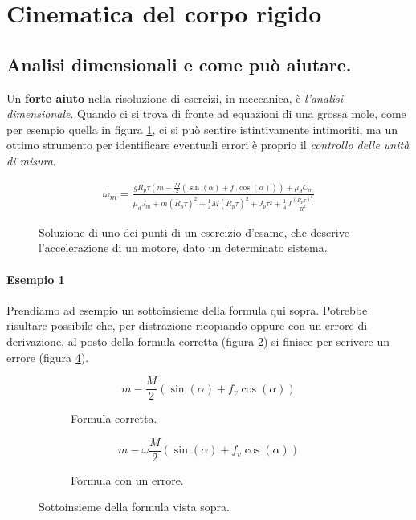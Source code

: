 \documentclass[main.tex]{subfiles}
\begin{document}
\section{Cinematica del corpo rigido}

\subsection{Analisi dimensionali e come può aiutare.}
Un \textbf{forte aiuto} nella risoluzione di esercizi, in meccanica, è \textit{l'analisi dimensionale}. Quando ci si trova di fronte ad equazioni di una grossa mole, come per esempio quella in figura \ref{big_equation}, ci si può sentire istintivamente intimoriti, ma un ottimo strumento per identificare eventuali errori è proprio il \textit{controllo delle unità di misura}.


\begin{figure}[H]
  \begin{equation}
\begin{split}
\dot{\omega_m} = \frac{gR_p\tau(m -\frac{M}{2}(\sin(\alpha) + f_v\cos(\alpha))) + \mu_{d}C_m}{\mu_{d}J_m  + m(R_p\tau)^2 + \frac{1}{4}M(R_p\tau)^2 + J_p \tau^2 + \frac{1}{4}J \frac{(R_p\tau)^2}{R^2}}
\end{split}
\end{equation}
\caption{Soluzione di uno dei punti di un esercizio d'esame, che descrive l'accelerazione di un motore, dato un determinato sistema.}
\label{big_equation}
\end{figure}

\paragraph{Esempio 1}
Prendiamo ad esempio un sottoinsieme della formula qui sopra. Potrebbe risultare possibile che, per distrazione ricopiando oppure con un errore di derivazione, al posto della formula corretta (figura \ref{formula_corretta_1}) si finisce per scrivere un errore (figura \ref{formula_sbagliata_1}).

\begin{figure}[H]
  \begin{subfigure}[b]{.5\textwidth}
  \centering
  \[
  m -\frac{M}{2}(\sin(\alpha) + f_v\cos(\alpha))
  \]
  \caption{Formula corretta.}
  \label{formula_corretta_1}
  \end{subfigure}
  \hfill
  \begin{subfigure}[b]{.5\textwidth}
  \centering
  \[
  m -\omega\frac{M}{2}(\sin(\alpha) + f_v\cos(\alpha))
  \]
  \caption{Formula con un errore.}
  \label{formula_sbagliata_1}
  \end{subfigure}
  \caption{Sottoinsieme della formula vista sopra.}
\end{figure}
\end{document}
